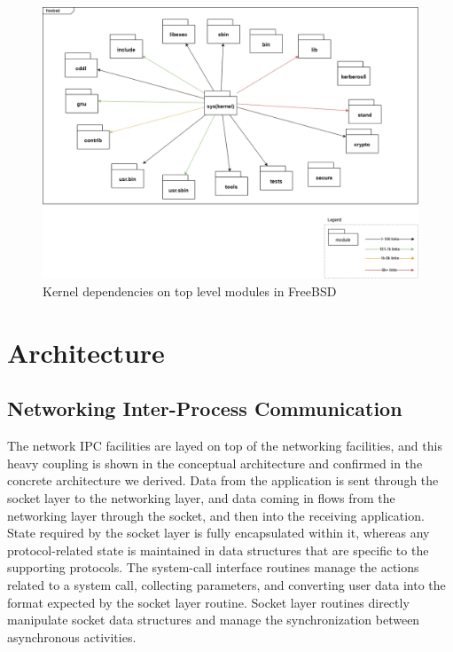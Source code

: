 \documentclass[12pt, dvipsnames, a4paper]{article}
\begin{document}
\begin{figure}[!htb]
	\center
	\includegraphics[width = 390pt]{assets/kernel-dependencies.png}
	\caption{Kernel dependencies on top level modules in FreeBSD}
\end{figure}
\clearpage
\section{Architecture}
\subsection{Networking Inter-Process Communication}
The network IPC facilities are layed on top of the networking facilities, and this heavy coupling is shown in the conceptual architecture and confirmed in the concrete architecture we derived. Data from the application is sent through the socket layer to the networking layer, and data coming in flows from the networking layer through the socket, and then into the receiving application.  State required by the socket layer is fully encapsulated within it, whereas any protocol-related state is maintained in data structures that are specific to the supporting protocols. The system-call interface routines manage the actions related to a system call, collecting parameters, and converting user data into the format expected by the socket layer routine. Socket layer routines directly manipulate socket data structures and manage the synchronization between asynchronous activities.
\end{document}
